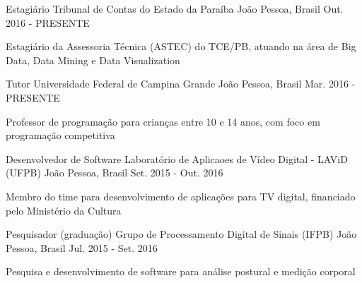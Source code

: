 

\begin{cventries}

  \cventry
    {Estagiário} %
    {Tribunal de Contas do Estado da Paraíba} %
    {João Pessoa, Brasil} %
    {Out. 2016 - PRESENTE} %
    {
      \begin{cvitems} %
        \item {Estagiário da Assessoria Técnica (ASTEC) do TCE/PB, atuando na área de Big Data, Data Mining e Data Visualization}
      \end{cvitems}
    }

  \cventry
    {Tutor} %
    {Universidade Federal de Campina Grande} %
    {João Pessoa, Brasil} %
    {Mar. 2016 - PRESENTE} %
    {
      \begin{cvitems} %
        \item {Professor de programação para crianças entre 10 e 14 anos, com foco em programação competitiva}
      \end{cvitems}
    }

\cventry
    {Desenvolvedor de Software} %
    {Laboratório  de Aplicaoes de Vídeo Digital - LAViD (UFPB)} %
    {João Pessoa, Brasil} %
    {Set. 2015 - Out. 2016} %
    {
      \begin{cvitems} %
        \item {Membro do time para desenvolvimento de aplicações para TV digital, financiado pelo Ministério da Cultura}
      \end{cvitems}
    }
  
  \cventry
    {Pesquisador (graduação)} %
    {Grupo de Processamento Digital de Sinais (IFPB)} %
    {João Pessoa, Brasil} %
    {Jul. 2015 - Set. 2016} %
    {
      \begin{cvitems} %
	    \item {Pesquisa e desenvolvimento de software para análise postural e medição corporal}
      \end{cvitems}
    }
  

\end{cventries}
